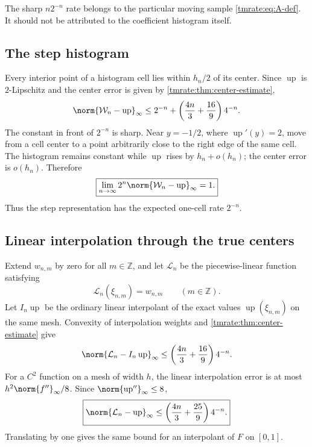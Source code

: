 \documentclass[11pt,oneside]{article}
\theoremstyle{definition}
\theoremstyle{remark}
\newcommand{\Z}{\mathbb Z}
\newcommand{\Up}{\operatorname{up}}
\begin{document}
The sharp $n2^{-n}$ rate belongs to the particular moving sample
\eqref{tmrate:eq:A-def}.  It should not be attributed to the coefficient histogram
itself.

\subsection{The step histogram}

Every interior point of a histogram cell lies within $h_n/2$ of its center.
Since $\Up$ is $2$-Lipschitz and the center error is given by
\cref{tmrate:thm:center-estimate},
\begin{equation}
 \norm{\mathcal W_n-\Up}_\infty
 \le 2^{-n}+
 \left(\frac{4n}{3}+\frac{16}{9}\right)4^{-n}.             \label{tmrate:eq:histogram-upper}
\end{equation}
The constant in front of $2^{-n}$ is sharp.  Near $y=-1/2$, where
$\Up'(y)=2$, move from a cell center to a point arbitrarily close to the right
edge of the same cell.  The histogram remains constant while $\Up$ rises by
$h_n+o(h_n)$; the center error is $o(h_n)$.  Therefore
\begin{equation}
 \boxed{\displaystyle
 \lim_{n\to\infty}2^n\norm{\mathcal W_n-\Up}_\infty=1.}   \label{tmrate:eq:histogram-sharp}
\end{equation}
Thus the step representation has the expected one-cell rate $2^{-n}$.

\subsection{Linear interpolation through the true centers}

Extend $w_{n,m}$ by zero for all $m\in\Z$, and let $\mathcal L_n$ be the
piecewise-linear function satisfying
\begin{equation}
 \mathcal L_n(\xi_{n,m})=w_{n,m}
 \qquad(m\in\Z).                                          \label{tmrate:eq:linear-interpolant}
\end{equation}
Let $I_n\Up$ be the ordinary linear interpolant of the exact values
$\Up(\xi_{n,m})$ on the same mesh.  Convexity of interpolation weights and
\cref{tmrate:thm:center-estimate} give
\begin{equation*}
 \norm{\mathcal L_n-I_n\Up}_\infty
 \le\left(\frac{4n}{3}+\frac{16}{9}\right)4^{-n}.
\end{equation*}
For a $C^2$ function on a mesh of width $h$, the linear interpolation error is at
most $h^2\norm{f''}_\infty/8$.  Since $\norm{\Up''}_\infty\le8$,
\begin{equation}
 \boxed{\displaystyle
 \norm{\mathcal L_n-\Up}_\infty
 \le\left(\frac{4n}{3}+\frac{25}{9}\right)4^{-n}.}        \label{tmrate:eq:linear-rate}
\end{equation}
Translating by one gives the same bound for an interpolant of $F$ on $[0,1]$.
\end{document}
